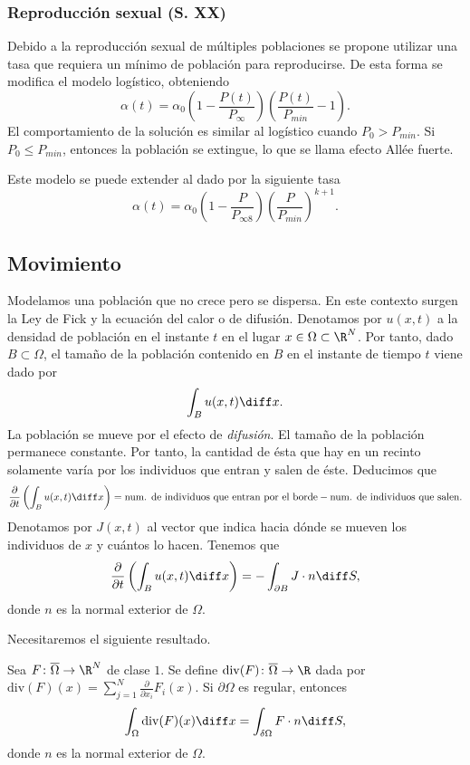 \documentclass{article}
\begin{document}
\subsubsection{Reproducción sexual (S. XX)}

Debido a la reproducción sexual de múltiples poblaciones se propone utilizar una tasa que requiera
un mínimo de población para reproducirse. De esta forma se modifica el modelo logístico, obteniendo
\[ \alpha(t) = \alpha_0 \left(1- \frac{P(t)}{P_{\infty}}\right)\left(\frac{P(t)}{P_{min}}
    -1\right). \] El comportamiento de la solución es similar al logístico cuando $P_0 >
P_{min}$. Si $P_0 \le P_{min}$, entonces la población se extingue, lo que se llama efecto Allée
fuerte.

Este modelo se puede extender al dado por la siguiente tasa
\[ \alpha(t) = \alpha_0 (1- \frac{P}{P_{\infty8}}) (\frac{P}{P_{min}})^{k+1}. \]

\subsection{Movimiento}

Modelamos una población que no crece pero se dispersa. En este contexto surgen la Ley de Fick y la
ecuación del calor o de difusión. Denotamos por $u(x,t)$ a la densidad de población en el instante
$t$ en el lugar $x \in \Omega \subset \R^N$. Por tanto, dado $B \subset \Omega$, el tamaño de la
población contenido en $B$ en el instante de tiempo $t$ viene dado por
\[ \int_B u(x,t) \diff x. \] La población se mueve por el efecto de \emph{difusión}. El tamaño de la
población permanece constante. Por tanto, la cantidad de ésta que hay en un recinto solamente varía
por los individuos que entran y salen de éste. Deducimos que
\[ \frac{\partial}{\partial t} \left( \int_B u(x,t) \diff x\right) = \text{num. de individuos que
    entran por el borde} - \text{num. de individuos que salen}. \] Denotamos por $J(x,t)$ al vector
que indica hacia dónde se mueven los individuos de $x$ y cuántos lo hacen. Tenemos que
\begin{equation}
  \label{eq:mov:1}
  \frac{\partial}{\partial t} \left( \int_B u(x,t) \diff x\right) = - \int_{\partial B} J \cdot n \diff S,
\end{equation}
donde $n$ es la normal exterior de $\Omega$.

Necesitaremos el siguiente resultado.

\begin{theorem}
  \label{thm:divergencia}
  Sea $F \colon \overline{\Omega} \to \R^N$ de clase $1$. Se define
  $\mathrm{div}(F) \colon \overline{\Omega} \to \R$ dada por
  $\mathrm{div}(F)(x) = \sum_{j = 1}^N \frac{\partial}{\partial x_i} F_i(x)$.  Si $\partial\Omega$
  es regular, entonces
  \[ \int_{\Omega} \mathrm{div}(F)(x) \diff x = \int_{\delta \Omega} F \cdot n \diff S, \] donde $n$
  es la normal exterior de $\Omega$.
\end{theorem}
\end{document}
